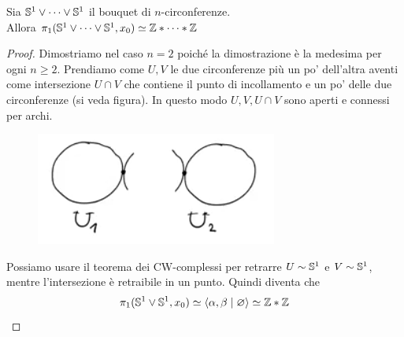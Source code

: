\begin{xca}
	Sia $\S^1 \lor \dots \lor \S^1$ il bouquet di $n$-circonferenze. \\ Allora $\pi_1(\S^1 \lor \dots \lor \S^1, x_0) \simeq \Z \ast \dots \ast \Z$
\end{xca}
\begin{proof}
	Dimostriamo nel caso $n=2$ poiché la dimostrazione è la medesima per ogni $n \ge 2$. Prendiamo come $U, V$ le due circonferenze più un po' dell'altra aventi come intersezione $U \cap V$ che contiene il punto di incollamento e un po' delle due circonferenze (si veda figura). In questo modo $U,V,U \cap V$ sono aperti e connessi per archi.
	\begin{figure}[h]
		\centering
		\includegraphics[width=0.4\linewidth]{images/topologia_algebrica/bouquet-circle-fundamental-group}
		\caption{}
		\label{fig:bouquet-circle-fundamental-group}
	\end{figure}
	Possiamo usare il teorema dei CW-complessi per retrarre $U \sim \S^1$ e $V \sim \S^1$, mentre l'intersezione è retraibile in un punto. Quindi diventa che 
	\begin{equation*}
		\pi_1(\S^1 \lor \S^1, x_0) \simeq \left\langle \alpha, \beta \mid \varnothing \right\rangle \simeq \Z \ast \Z
	\end{equation*}
\end{proof}

